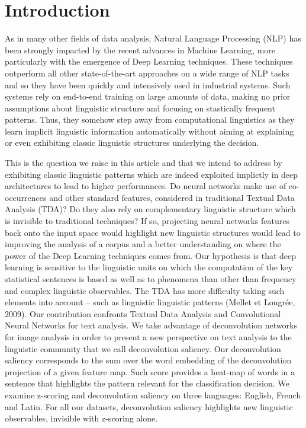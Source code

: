 \section{Introduction}
As in many other fields of data analysis, Natural Language Processing (NLP) has been strongly impacted by the recent advances in Machine Learning, more particularly with the emergence of Deep Learning techniques. These techniques outperform all other state-of-the-art approaches on a wide range of NLP tasks and so they have been quickly and intensively used in industrial systems. Such systems rely on end-to-end training on large amounts of data, making no prior assumptions about linguistic structure and focusing on stastically frequent patterns. Thus, they somehow step away from computational linguistics as they learn implicit linguistic information automatically without aiming at explaining or even exhibiting classic linguistic structures underlying the decision.

This is the question we raise in this article and that we intend to address by exhibiting classic linguistic patterns which are indeed exploited implictly in deep architectures to lead to higher performances.
Do neural networks make use of co-occurrences and other standard features, considered in traditional Textual Data Analysis (TDA)? 
Do they also rely on complementary linguistic structure which is invisible to traditional techniques? If so, projecting neural networks 
features back onto the input space would highlight new linguistic structures would lead to improving the analysis of a corpus and a better understanding on where the power of the Deep Learning techniques comes from.
Our hypothesis is that deep learning is sensitive to the linguistic units on which the computation of the key statistical sentences is based as well as to phenomena than other than frequency and complex linguistic 
observables. The TDA has more difficulty taking such elements into account -- such as linguistic linguistic patterns (Mellet et Longrée, 2009).
Our contribution confronts Textual Data Analysis and Convolutional Neural Networks for text analysis. 
We take advantage of deconvolution networks for image analysis in order to present a new perspective on text analysis to the linguistic community that we call deconvolution saliency. Our deconvolution saliency corresponds to the sum over the 
word embedding of the deconvolution projection of a given feature map. Such score provides a heat-map of 
words in a sentence that highlights the pattern relevant for the classification decision.
We examine z-scoring and deconvolution saliency on three languages: English, 
French and Latin. For all our datasets, deconvolution saliency highlights new linguistic observables, invisible with z-scoring alone.


